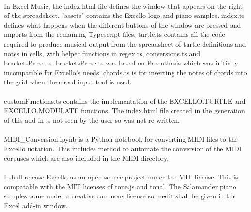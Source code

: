 \paragraph{} In Excel Music, the index.html file defines the window that appears on the right of the spreadsheet. "assets" contains the Excello logo and piano samples. index.ts defines what happens when the different buttons of the window are pressed and imports from the remaining Typescript files. turtle.ts contains all the code required to produce musical output from the spreadsheet of turtle definitions and notes in cells, with helper functions in regex.ts, conversions.ts and bracketsParse.ts. bracketsParse.ts was based on Parenthesis which was initially incompatible for Excello's needs. chords.ts is for inserting the notes of chords into the grid when the chord input tool is used.

\paragraph{} customFunctions.ts contains the implementation of the EXCELLO.TURTLE and EXCELLO.MODULATE functions. The index.html file created in the generation of this add-in is not seen by the user so was not re-written.

\paragraph{} MIDI\_Conversion.ipynb is a Python notebook for converting MIDI files to the Excello notation. This includes method to automate the conversion of the MIDI corpuses which are also included in the MIDI directory.

\paragraph{} I shall release Excello as an open source project under the MIT license. This is compatable with the MIT licenses of tone.js and tonal. The Salamander piano samples come under a creative commons license so credit shall be given in the Excel add-in window.
